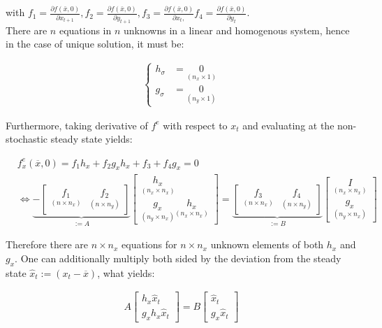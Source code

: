 \documentclass{pracamgr}
\numberwithin{equation}{section}
\begin{document}
with $f_1= \frac{\partial f (\bar{x}, 0)}{\partial x_{t+1}}, f_2=  \frac{\partial f (\bar{x}, 0)}{\partial y_{t+1}},  f_3=\frac{\partial f (\bar{x}, 0)}{\partial x_{t},}  f_4=\frac{\partial f (\bar{x}, 0)}{\partial y_{t}}$. \\

There are $n$ equations in $n$ unknowns in a linear and homogenous system, hence in the case of unique solution, it must be:

\begin{align}
\left\{
\begin{array}{cl}
h_\sigma &= \underset{(n_x\times 1)}{0} \\
g_\sigma &= \underset{(n_y \times 1)}{0} 
\end{array}
\right.
\end{align}

Furthermore, taking derivative of $f^{e}$ with respect to $x_t$ and evaluating at the non-stochastic steady state yields:

\begin{eqnarray}
&    f^{e}_x (\overline{x},0) = f_1 h_x + f_2 g_x h_x + f_3 + f_4 g_x = 0 \nonumber \\
& \iff \underbrace{- \begin{bmatrix} \underset{(n\times n_x)}{f_1} & \underset{(n\times n_y)}{f_2} \end{bmatrix}}_{:=A} \begin{bmatrix} \underset{(n_x\times n_x)}{h_x} \\ \underset{(n_y\times n_x)}{g_x} \underset{(n_x\times n_x)}{h_x} \end{bmatrix}  = \underbrace{\begin{bmatrix} \underset{(n\times n_x)}{f_3} & \underset{(n\times n_y)}{f_4}\end{bmatrix}}_{:=B} \begin{bmatrix} \underset{(n_x\times n_x)}{I} \\\underset{(n_y\times n_x)}{g_x} \end{bmatrix}
\end{eqnarray}
  
Therefore there are $n\times n_x$ equations for $n\times n_x$ unknown elements of both $h_x$ and $g_x$. One can additionally multiply both sided by the deviation from the steady state $\widehat{x}_t := (x_t-\overline{x})$, what yields:

 \begin{align}
 A \begin{bmatrix} h_x \widehat{x}_t \\ g_x h_x \widehat{x}_t \end{bmatrix} = B \begin{bmatrix} \widehat{x}_t \\ g_x \widehat{x}_t \end{bmatrix}
  \end{align}
\end{document}
